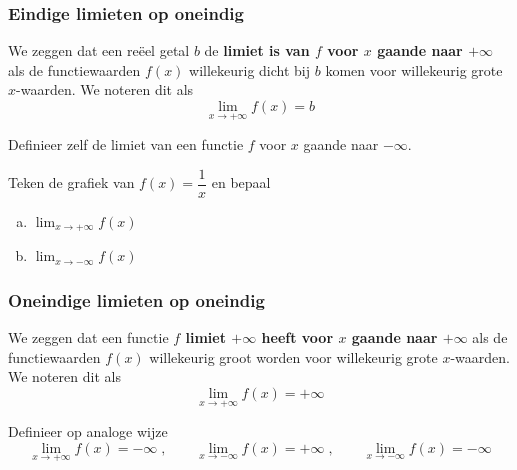 \documentclass[12pt]{article}
\newenvironment{definitie}
{
  \vspace{0.4cm}
  \begin{mdframed}[nobreak=true,frametitle={Definitie}]
  }{%
  \end{mdframed}
}
\begin{document}
\subsubsection*{Eindige limieten op oneindig}

\begin{definitie}
  We zeggen dat een reëel getal $b$ de {\bf limiet is van $f$ voor $x$ gaande naar $+\infty$} als de functiewaarden $f(x)$ willekeurig dicht bij $b$ komen voor willekeurig grote $x$-waarden. We noteren dit als
  $$\lim_{x\to +\infty} f(x)=b$$
\end{definitie}

\begin{oefening}
  Definieer zelf de limiet van een functie $f$ voor $x$ gaande naar $-\infty$.
\end{oefening}

\begin{oefening}
  Teken de grafiek van $f(x)=\dfrac{1}{x}$ en bepaal
  \begin{enumerate}[(a)]
  \item $\displaystyle \lim_{x\to +\infty} f(x)$
  \item $\displaystyle \lim_{x\to -\infty} f(x)$
  \end{enumerate}
\end{oefening}

\subsubsection*{Oneindige limieten op oneindig}

\begin{definitie}
  We zeggen dat een functie  {\bf $f$ limiet $+\infty$ heeft voor $x$ gaande naar $+\infty$} als de functiewaarden $f(x)$ willekeurig groot worden voor willekeurig grote $x$-waarden. We noteren dit als
  $$\lim_{x\to +\infty} f(x)=+\infty$$
\end{definitie}

\begin{oefening}
  Definieer op analoge wijze
  $$\lim_{x\to +\infty} f(x)=-\infty\;,\qquad\lim_{x\to -\infty} f(x)=+\infty\;,\qquad\lim_{x\to -\infty} f(x)=-\infty$$
\end{oefening}
\end{document}
